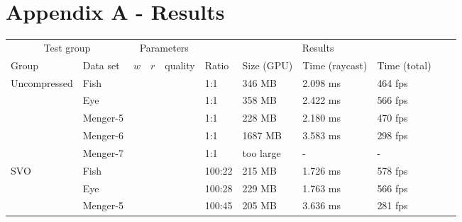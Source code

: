 \chapter*{Appendix A - Results}

\begin{table}[H]
\begin{tabular}{*{11}{l}}
\toprule
\multicolumn{2}{c}{Test group} & \multicolumn{3}{c}{Parameters} & \multicolumn{4}{c}{Results} \\
\cmidrule(r){1-2}\cmidrule(l){3-6}%
Group                   & Data set         & $w$            & $r$            & quality           & Ratio            & Size (GPU)            & Time (raycast)        & Time (total)\\
\midrule
\multirow{4}{*}{Uncompressed}
                            & Fish               &                    &                  &                      & 1:1                     & 346 MB               & 2.098 ms                 & 464 fps \\
                            & Eye                &                    &                  &                      & 1:1                     & 358 MB              & 2.422 ms                  & 566 fps \\
                            & Menger-5       &                    &                  &                      & 1:1                     & 228 MB               & 2.180 ms                 & 470 fps \\
                            & Menger-6       &                    &                  &                      & 1:1                     & 1687 MB             & 3.583 ms                & 298 fps \\
                            & Menger-7       &                    &                  &                      & 1:1                     & too large             & -                             & -\\
\midrule
\multirow{4}{*}{SVO}
                            & Fish               &                    &                  &                      & 100:22                & 215 MB          & 1.726 ms                    & 578 fps \\
                            & Eye                &                    &                  &                      & 100:28                & 229 MB         & 1.763 ms                    & 566 fps \\
                            & Menger-5       &                    &                  &                      & 100:45                & 205 MB          & 3.636 ms                & 281 fps \\

\end{tabular}
\end{table}
